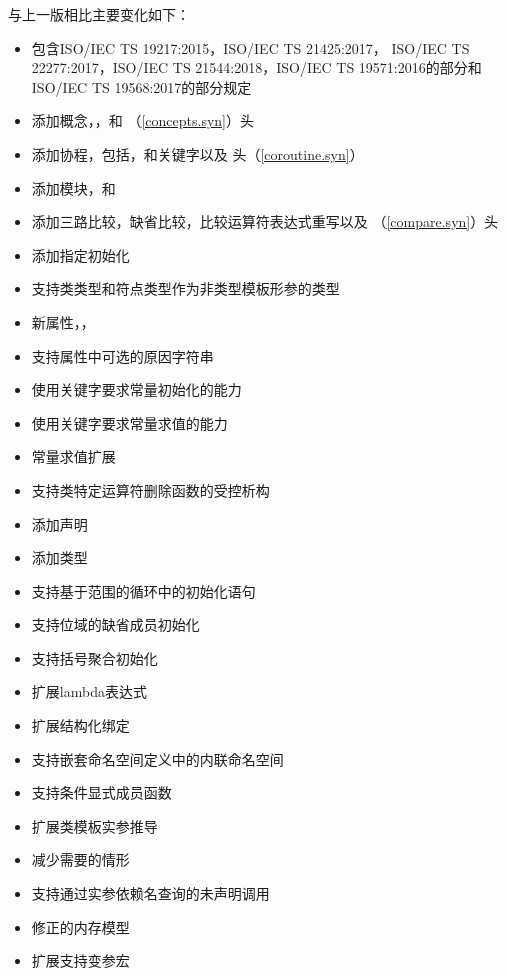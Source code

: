 \noindent
与上一版相比主要变化如下：
\begin{itemize}
  \renewcommand{\labelitemi}{---}
    \item{包含ISO/IEC TS 19217:2015，ISO/IEC TS 21425:2017，
    ISO/IEC TS 22277:2017，ISO/IEC TS 21544:2018，ISO/IEC TS 19571:2016的部分和
    ISO/IEC TS 19568:2017的部分规定}
  \item{添加概念，，和
    （\ref{concepts.syn}）头}
  \item{添加协程，包括，和关键字以及
    头（\ref{coroutine.syn}）}
  \item{添加模块，和}
  \item{添加三路比较，缺省比较，比较运算符表达式重写以及
    （\ref{compare.syn}）头}
  \item{添加指定初始化}
  \item{支持类类型和符点类型作为非类型模板形参的类型}
  \item{新属性，\tm{[[likely]]}，\tm{[[unlikely]]}}
  \item{支持\tm{[[nodiscard]]}属性中可选的原因字符串}
  \item{使用关键字要求常量初始化的能力}
  \item{使用关键字要求常量求值的能力}
  \item{常量求值扩展}
  \item{支持类特定运算符删除函数的受控析构}
  \item{添加声明}
  \item{添加类型}
  \item{支持基于范围的循环中的初始化语句}
  \item{支持位域的缺省成员初始化}
  \item{支持括号聚合初始化}
  \item{扩展lambda表达式}
  \item{扩展结构化绑定}
  \item{支持嵌套命名空间定义中的内联命名空间}
  \item{支持条件显式成员函数}
  \item{扩展类模板实参推导}
  \item{减少需要的情形}
  \item{支持通过实参依赖名查询的未声明调用}
  \item{修正的内存模型}
  \item{扩展支持变参宏}

\end{itemize}
